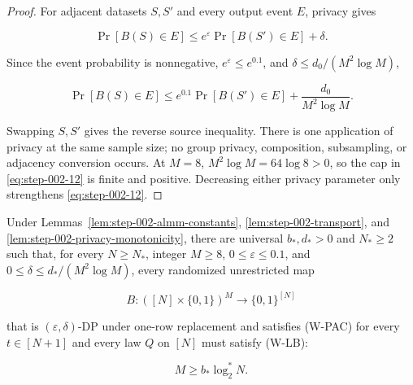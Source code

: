 \begin{proof}
For adjacent datasets \(S,S'\) and every output event \(E\), privacy gives

\[
\Pr[B(S)\in E]
\le e^{\varepsilon}\Pr[B(S')\in E]+\delta.
\]

Since the event probability is nonnegative, \(e^{\varepsilon}\le e^{0.1}\), and
\(\delta\le d_0/(M^2\log M)\),

\[
\Pr[B(S)\in E]
\le e^{0.1}\Pr[B(S')\in E]
   +\frac{d_0}{M^2\log M}.
\tag{S2.12}\label{eq:step-002-12}
\]

Swapping \(S,S'\) gives the reverse source inequality. There is one application of privacy at the same sample size; no group privacy, composition, subsampling, or adjacency conversion occurs. At \(M=8\), \(M^2\log M=64\log8>0\), so the cap in \eqref{eq:step-002-12} is finite and positive. Decreasing either privacy parameter only strengthens \eqref{eq:step-002-12}. \end{proof}

\begin{proposition}\label{prop:step-002-wrapper}
Under Lemmas~\ref{lem:step-002-almm-constants},
\ref{lem:step-002-transport}, and
\ref{lem:step-002-privacy-monotonicity}, there are universal
\(b_*,d_*>0\) and \(N_*\ge2\) such that, for every \(N\ge N_*\), integer \(M\ge8\),
\(0\le\varepsilon\le0.1\), and
\(0\le\delta\le d_*/(M^2\log M)\), every randomized unrestricted map

\[
B:([N]\times\{0,1\})^M\to\{0,1\}^{[N]}
\]

that is \((\varepsilon,\delta)\)-DP under one-row replacement and satisfies (W-PAC) for every \(t\in[N+1]\) and every law \(Q\) on \([N]\) must satisfy (W-LB):

\[
M\ge b_*\log_2^*N.
\]
\end{proposition}

